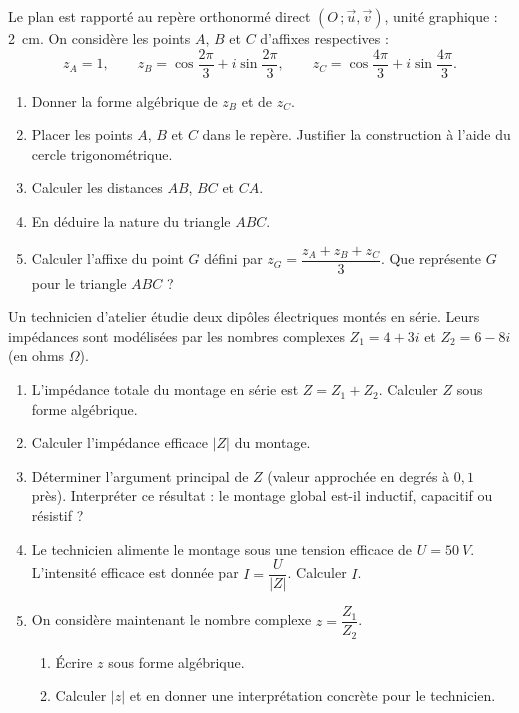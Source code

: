 \documentclass[11pt]{article}
\begin{document}
\begin{exercice}
Le plan est rapporté au repère orthonormé direct $(O\,;\vec{u},\vec{v})$, unité graphique : \SI{2}{cm}. On considère les points $A$, $B$ et $C$ d'affixes respectives :
\[ z_A = 1, \qquad z_B = \cos\frac{2\pi}{3} + i\sin\frac{2\pi}{3}, \qquad z_C = \cos\frac{4\pi}{3} + i\sin\frac{4\pi}{3}. \]
\begin{enumerate}
\item Donner la forme algébrique de $z_B$ et de $z_C$.
\item Placer les points $A$, $B$ et $C$ dans le repère. Justifier la construction à l'aide du cercle trigonométrique.
\item Calculer les distances $AB$, $BC$ et $CA$.
\item En déduire la nature du triangle $ABC$.
\item Calculer l'affixe du point $G$ défini par $z_G = \dfrac{z_A + z_B + z_C}{3}$. Que représente $G$ pour le triangle $ABC$ ?
\end{enumerate}
\end{exercice}

\begin{exercice}
Un technicien d'atelier étudie deux dipôles électriques montés en série. Leurs impédances sont modélisées par les nombres complexes $Z_1 = 4 + 3i$ et $Z_2 = 6 - 8i$ (en ohms $\Omega$).
\begin{enumerate}
\item L'impédance totale du montage en série est $Z = Z_1 + Z_2$. Calculer $Z$ sous forme algébrique.
\item Calculer l'impédance efficace $|Z|$ du montage.
\item Déterminer l'argument principal de $Z$ (valeur approchée en degrés à $0,1$ près). Interpréter ce résultat : le montage global est-il inductif, capacitif ou résistif ?
\item Le technicien alimente le montage sous une tension efficace de $U = \SI{50}{V}$. L'intensité efficace est donnée par $I = \dfrac{U}{|Z|}$. Calculer $I$.
\item On considère maintenant le nombre complexe $z = \dfrac{Z_1}{Z_2}$.
\begin{enumerate}
\item Écrire $z$ sous forme algébrique.
\item Calculer $|z|$ et en donner une interprétation concrète pour le technicien.
\end{enumerate}
\end{enumerate}
\end{exercice}
\end{document}
